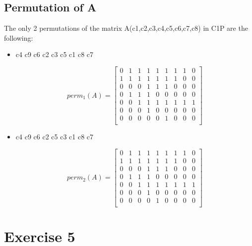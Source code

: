 \documentclass[]{article}
\begin{document}
\subsection{Permutation of A  }

The only 2 permutations of the matrix A(c1,c2,c3,c4,c5,c6,c7,c8) in C1P are the following:

\begin{itemize}

\item c4 c9 c6 c2 c3 c5 c1 c8 c7

\[perm_{1}(A)=\begin{bmatrix}
0 & 1 & 1 & 1 & 1 & 1 & 1 & 1 & 0 \\
1 & 1 & 1 & 1 & 1 & 1 & 1 & 0 & 0 \\
0 & 0 & 0 & 1 & 1 & 1 & 0 & 0 & 0 \\
0 & 1 & 1 & 1 & 0 & 0 & 0 & 0 & 0 \\
0 & 0 & 1 & 1 & 1 & 1 & 1 & 1 & 1 \\
0 & 0 & 0 & 1 & 0 & 0 & 0 & 0 & 0 \\
0 & 0 & 0 & 0 & 0 &1 & 0 & 0 & 0 \\
\end{bmatrix}\]

\item c4 c9 c6 c2 c5 c3 c1 c8 c7

\[perm_{2}(A)=\begin{bmatrix}
0 & 1 & 1 & 1 & 1 & 1 & 1 & 1 & 0 \\
1 & 1 & 1 & 1 & 1 & 1 & 1 & 0 & 0 \\
0 & 0 & 0 & 1 & 1 & 1 & 0 & 0 & 0 \\
0 & 1 & 1 & 1 & 0 & 0 & 0 & 0 & 0 \\
0 & 0 & 1 & 1 & 1 & 1 & 1 & 1 & 1 \\
0 & 0 & 0 & 1 & 0 & 0 & 0 & 0 & 0 \\
0 & 0 & 0 & 0 & 1 & 0 & 0 & 0 & 0 \\
\end{bmatrix}\]



\end{itemize}


\section{Exercise 5}
\end{document}
